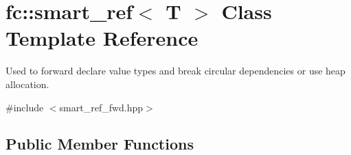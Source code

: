 \hypertarget{classfc_1_1smart__ref}{}\section{fc\+:\+:smart\+\_\+ref$<$ T $>$ Class Template Reference}
\label{classfc_1_1smart__ref}


Used to forward declare value types and break circular dependencies or use heap allocation.  




{\ttfamily \#include $<$smart\+\_\+ref\+\_\+fwd.\+hpp$>$}

\subsection*{Public Member Functions}
